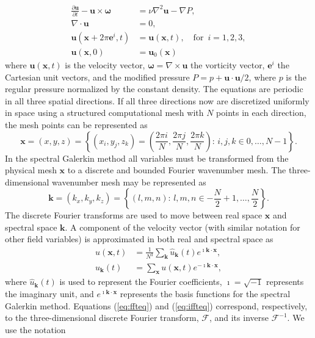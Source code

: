 \documentclass[11pt, oneside]{article}
\begin{document}
\begin{align}
 \frac{\partial \bm{u}}{\partial t} - \bm{u} \times \bm{\omega}   &= \nu \nabla^2 \bm{u} - \nabla{P}, \label{eq:NS} \\
 \nabla \cdot \bm{u} &= 0, \\
 \bm{u}(\bm{x}+2\pi \bm{e}^i, t) &= \bm{u}(\bm{x}, t), \quad \text{for }\, i=1,2,3,\\
 \bm{u}(\bm{x}, 0) &= \bm{u}_0(\bm{x})
\end{align}
where $\bm{u}(\bm{x}, t)$ is the velocity vector, $\bm{\omega}=\nabla \times \bm{u}$ the vorticity vector, $\bm{e}^i$ the Cartesian unit vectors, and the modified pressure $P=p+\bm{u}\cdot \bm{u}/2$, where $p$ is the regular pressure normalized by the constant density. The equations are periodic in all three spatial directions. If all three directions now are discretized uniformly in space using a structured computational mesh with $N$ points in each direction, the mesh points can be represented as
\begin{equation}
\bm{x} = (x, y, z) = \left\{(x_i, y_j, z_k) = \left( \frac{2\pi i}{N}, \frac{2\pi j}{N}, \frac{2\pi k}{N} \right): \, i,j,k \in 0,\ldots, N-1 \right\}.
\label{eq:realmesh}
\end{equation}
In the spectral Galerkin method all variables must be transformed from the physical mesh $\bm{x}$ to a discrete and bounded Fourier wavenumber mesh. The three-dimensional wavenumber mesh may be represented as
\begin{equation}
\bm{k} = (k_x, k_y, k_z) = \left\{(l, m, n): \, l, m, n \in -\frac{N}{2}+1,\ldots, \frac{N}{2} \right\}.
\label{eq:kmesh}
\end{equation}
The discrete Fourier transforms are used to move between real space $\bm{x}$ and spectral space $\bm{k}$. A component of the velocity vector (with similar notation for other field variables) is approximated in both real and spectral space as
\begin{align}
u(\bm{x}, t) &= \frac{1}{N^3}\sum_{\bm{k}} \hat{u}_{\bm{k}}(t) e^{\imath \bm{k}\cdot \bm{x}}, \label{eq:ffteq} \\
\hat{u}_{\bm{k}}(t) &= \sum_{\bm{x}} u(\bm{x}, t) e^{-\imath \bm{k}\cdot \bm{x}},\label{eq:iffteq}
\end{align}
where $\hat{u}_{\bm{k}}(t)$ is used to represent the Fourier coefficients, $\imath=\sqrt{-1}$ represents the imaginary unit, and $e^{\imath \bm{k}\cdot \bm{x}}$ represents the basis functions for the spectral Galerkin method. Equations (\ref{eq:ffteq}) and (\ref{eq:iffteq}) correspond, respectively, to the three-dimensional discrete Fourier transform, $\mathcal{F}$, and its inverse $\mathcal{F}^{-1}$. We use the notation
\end{document}

